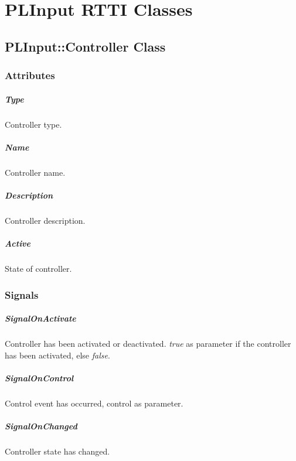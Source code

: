 \chapter{PLInput RTTI Classes}




\section{PLInput::Controller Class}


\subsection{Attributes}

\paragraph{Type}
Controller type.

\paragraph{Name}
Controller name.

\paragraph{Description}
Controller description.

\paragraph{Active}
State of controller.


\subsection{Signals}

\paragraph{SignalOnActivate}
Controller has been activated or deactivated. \emph{true} as parameter if the controller has been activated, else \emph{false}.

\paragraph{SignalOnControl}
Control event has occurred, control as parameter.

\paragraph{SignalOnChanged}
Controller state has changed.





